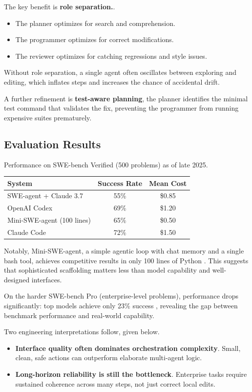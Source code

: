 The key benefit is \textbf{role separation.}.
\begin{itemize}
\item The planner optimizes for search and comprehension.
\item The programmer optimizes for correct modifications.
\item The reviewer optimizes for catching regressions and style issues.
\end{itemize}
Without role separation, a single agent often oscillates between exploring and editing, which inflates steps and increases the chance of accidental drift.

A further refinement is \textbf{test-aware planning}, the planner identifies the minimal test command that validates the fix, preventing the programmer from running expensive suites prematurely.

\subsection{Evaluation Results}

Performance on SWE-bench Verified (500 problems) as of late 2025.

\begin{center}
\begin{tabular}{lcc}
\toprule
System & Success Rate & Mean Cost \\
\midrule
SWE-agent + Claude 3.7 & 55\% & \$0.85 \\
OpenAI Codex & 69\% & \$1.20 \\
Mini-SWE-agent (100 lines) & 65\% & \$0.50 \\
Claude Code & 72\% & \$1.50 \\
\bottomrule
\end{tabular}
\end{center}

Notably, Mini-SWE-agent, a simple agentic loop with chat memory and a single bash tool, achieves competitive results in only 100 lines of Python \cite{springaibench2025}. This suggests that sophisticated scaffolding matters less than model capability and well-designed interfaces.

On the harder SWE-bench Pro (enterprise-level problems), performance drops significantly: top models achieve only 23\% success \cite{swebenchpro2025}, revealing the gap between benchmark performance and real-world capability.

Two engineering interpretations follow, given below.
\begin{itemize}
\item \textbf{Interface quality often dominates orchestration complexity}. Small, clean, safe actions can outperform elaborate multi-agent logic.
\item \textbf{Long-horizon reliability is still the bottleneck}. Enterprise tasks require sustained coherence across many steps, not just correct local edits.
\end{itemize}

